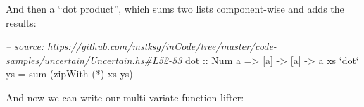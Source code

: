 \documentclass[]{article}
\newenvironment{Shaded}{}{}
\newcommand{\KeywordTok}[1]{\textcolor[rgb]{0.00,0.44,0.13}{\textbf{{#1}}}}
\newcommand{\DataTypeTok}[1]{\textcolor[rgb]{0.56,0.13,0.00}{{#1}}}
\newcommand{\CommentTok}[1]{\textcolor[rgb]{0.38,0.63,0.69}{\textit{{#1}}}}
\newcommand{\OtherTok}[1]{\textcolor[rgb]{0.00,0.44,0.13}{{#1}}}
\newcommand{\FunctionTok}[1]{\textcolor[rgb]{0.02,0.16,0.49}{{#1}}}
\newcommand{\NormalTok}[1]{{#1}}
\begin{document}
\begin{Shaded}
\end{Shaded}

And then a ``dot product'', which sums two lists component-wise and adds
the results:

\begin{Shaded}
\begin{Highlighting}[]
\CommentTok{-- source: https://github.com/mstksg/inCode/tree/master/code-samples/uncertain/Uncertain.hs#L52-53}
\OtherTok{dot ::} \DataTypeTok{Num} \NormalTok{a }\OtherTok{=>} \NormalTok{[a] }\OtherTok{->} \NormalTok{[a] }\OtherTok{->} \NormalTok{a}
\NormalTok{xs }\OtherTok{`dot`} \NormalTok{ys }\FunctionTok{=} \NormalTok{sum (zipWith (}\FunctionTok{*}\NormalTok{) xs ys)}
\end{Highlighting}
\end{Shaded}

And now we can write our multi-variate function lifter:
\end{document}
